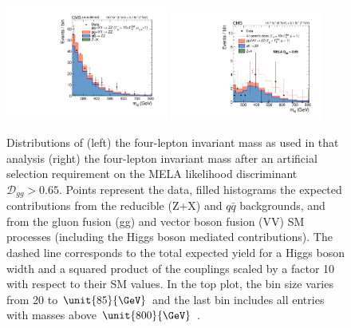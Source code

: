 \begin{figure}
\centering
\includegraphics[width=0.475\textwidth]{HZZ_Width/ZZMass_AR_20May2014.pdf}
\includegraphics[width=0.45\textwidth]{HZZ_Width/fig3a_new.pdf}
\caption[Distributions of (left) the four-lepton invariant mass as used in that analysis (right) the four-lepton invariant mass after an artificial selection requirement
on the MELA likelihood discriminant $\mathcal{D}_{gg} > 0.65$. Points represent the data, filled histograms the expected
contributions from the reducible (Z+X) and $q\bar{q}$ backgrounds, and
from the gluon fusion (gg) and vector boson fusion (VV) SM processes (including
the Higgs boson mediated contributions). The dashed line corresponds to the total
expected yield for a Higgs boson width and a squared product of the couplings scaled by a
factor 10 with respect to their SM values.
In the top plot, the bin size varies from 20 to $\unit{85}{\GeV}$ and the last bin includes
all entries with masses above $\unit{800}{\GeV}$.]{
Distributions of (left) the four-lepton invariant mass as used in that analysis (right) the four-lepton invariant mass after an artificial selection requirement
on the MELA likelihood discriminant $\mathcal{D}_{gg} > 0.65$. Points represent the data, filled histograms the expected
contributions from the reducible (Z+X) and $q\bar{q}$ backgrounds, and
from the gluon fusion (gg) and vector boson fusion (VV) SM processes (including
the Higgs boson mediated contributions). The dashed line corresponds to the total
expected yield for a Higgs boson width and a squared product of the couplings scaled by a
factor 10 with respect to their SM values.
In the top plot, the bin size varies from 20 to $\unit{85}{\GeV}$ and the last bin includes
all entries with masses above $\unit{800}{\GeV}$ \cite{Khachatryan:2014iha}.
}
\label{fig:mss-discr}
\end{figure}

